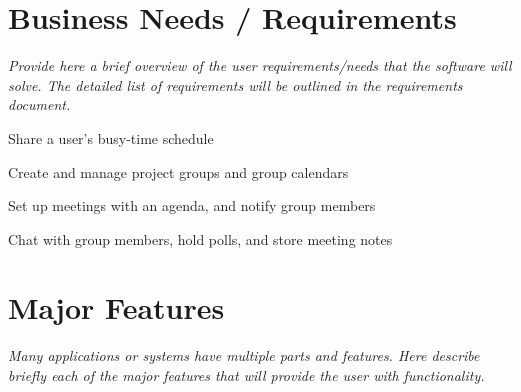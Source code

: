 \documentclass{article}
\begin{document}
\section{Business Needs / Requirements}

\textit{Provide here a brief overview of the user requirements/needs that the
software will solve. The detailed list of requirements will be outlined in the
requirements document.}

\begin{compactenum}%
    \item Share a user's busy-time schedule
    \item Create and manage project groups and group calendars
    \item Set up meetings with an agenda, and notify group members
    \item Chat with group members, hold polls, and store meeting notes
\end{compactenum}

\section{Major Features}

\textit{Many applications or systems have multiple parts and features. Here
describe briefly each of the major features that will provide the user with
functionality.}
\end{document}
